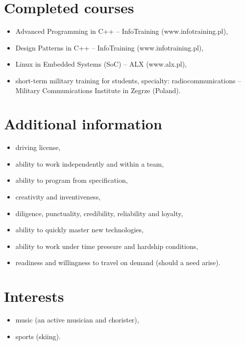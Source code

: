 \documentclass[10pt]{article}
\begin{document}
\section*{Completed courses}
\begin{itemize}
	\item Advanced Programming in C++ – InfoTraining (www.infotraining.pl),
	\item Design Patterns in C++ – InfoTraining (www.infotraining.pl),
	\item Linux in Embedded Systems (SoC) – ALX (www.alx.pl),
	\item short-term military training for students, specialty: radiocommunications – Military
	Communications Institute in Zegrze (Poland).
\end{itemize}

\section*{Additional information}
\begin{itemize}
	\item driving license,
	\item ability to work independently and within a team,
	\item ability to program from specification,
	\item creativity and inventiveness,
	\item diligence, punctuality, credibility, reliability and loyalty,
	\item ability to quickly master new technologies,
	\item ability to work under time pressure and hardship conditions,
	\item readiness and willingness to travel on demand (should a need arise).
\end{itemize}

\section*{Interests}
\begin{itemize}
	\item music (an active musician and chorister),
	\item sports (skiing).
\end{itemize}
\end{document}
